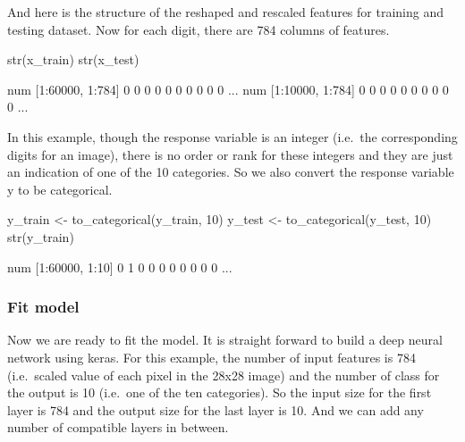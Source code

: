 \documentclass[
  12pt,
]{krantz}
\makeatletter
\newenvironment{Shaded}{\begin{snugshade}}{\end{snugshade}}
\newcommand{\DecValTok}[1]{\textcolor[rgb]{0.06,0.06,0.06}{#1}}
\newcommand{\FunctionTok}[1]{\textcolor[rgb]{0,0,0}{#1}}
\newcommand{\NormalTok}[1]{#1}
\newcommand{\OtherTok}[1]{\textcolor[rgb]{0.37,0.37,0.37}{#1}}
\newenvironment{kframe}{%
\medskip{}
\setlength{\fboxsep}{.8em}
 \def\at@end@of@kframe{}%
 \ifinner\ifhmode%
  \def\at@end@of@kframe{\end{minipage}}%
  \begin{minipage}{\columnwidth}%
 \fi\fi%
 \def\FrameCommand##1{\hskip\@totalleftmargin \hskip-\fboxsep
 \colorbox{shadecolor}{##1}\hskip-\fboxsep
     \hskip-\linewidth \hskip-\@totalleftmargin \hskip\columnwidth}%
 \MakeFramed {\advance\hsize-\width
   \@totalleftmargin\z@ \linewidth\hsize
   \@setminipage}}%
 {\par\unskip\endMakeFramed%
 \at@end@of@kframe}
\renewenvironment{Shaded}{\begin{kframe}}{\end{kframe}}
\makeatother
\begin{document}
And here is the structure of the reshaped and rescaled features for training and testing dataset. Now for each digit, there are 784 columns of features.

\begin{Shaded}
\begin{Highlighting}[]
\FunctionTok{str}\NormalTok{(x\_train)}
\FunctionTok{str}\NormalTok{(x\_test)}
\end{Highlighting}
\end{Shaded}

\begin{Shaded}
\begin{Highlighting}[]
\NormalTok{num [1:60000, 1:784] 0 0 0 0 0 0 0 0 0 0 ...}
\NormalTok{num [1:10000, 1:784] 0 0 0 0 0 0 0 0 0 0 ...}
\end{Highlighting}
\end{Shaded}

In this example, though the response variable is an integer (i.e.~the corresponding digits for an image), there is no order or rank for these integers and they are just an indication of one of the 10 categories. So we also convert the response variable y to be categorical.

\begin{Shaded}
\begin{Highlighting}[]
\NormalTok{y\_train }\OtherTok{\textless{}{-}} \FunctionTok{to\_categorical}\NormalTok{(y\_train, }\DecValTok{10}\NormalTok{)}
\NormalTok{y\_test }\OtherTok{\textless{}{-}} \FunctionTok{to\_categorical}\NormalTok{(y\_test, }\DecValTok{10}\NormalTok{)}
\FunctionTok{str}\NormalTok{(y\_train)}
\end{Highlighting}
\end{Shaded}

\begin{Shaded}
\begin{Highlighting}[]
\NormalTok{num [1:60000, 1:10] 0 1 0 0 0 0 0 0 0 0 ...}
\end{Highlighting}
\end{Shaded}

\hypertarget{fit-model}{%
\subsubsection{Fit model}\label{fit-model}}

Now we are ready to fit the model. It is straight forward to build a deep neural network using keras. For this example, the number of input features is 784 (i.e.~scaled value of each pixel in the 28x28 image) and the number of class for the output is 10 (i.e.~one of the ten categories). So the input size for the first layer is 784 and the output size for the last layer is 10. And we can add any number of compatible layers in between.
\end{document}
